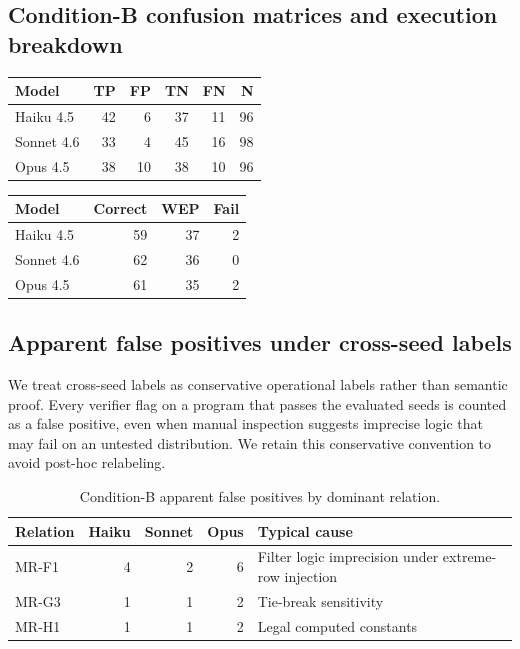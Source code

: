 \documentclass{article}
\begin{document}
\subsection{Condition-B confusion matrices and execution breakdown}

\noindent
\begin{minipage}[t]{0.52\linewidth}
\centering
{}
\small
\begin{tabular}{lrrrrr}
\toprule
Model & TP & FP & TN & FN & N \\
\midrule
Haiku 4.5 & 42 & 6 & 37 & 11 & 96 \\
Sonnet 4.6 & 33 & 4 & 45 & 16 & 98 \\
Opus 4.5 & 38 & 10 & 38 & 10 & 96 \\
\bottomrule
\end{tabular}
\end{minipage}%
\hfill
\begin{minipage}[t]{0.44\linewidth}
\centering
{}
\small
\begin{tabular}{lrrr}
\toprule
Model & Correct & WEP & Fail \\
\midrule
Haiku 4.5 & 59 & 37 & 2 \\
Sonnet 4.6 & 62 & 36 & 0 \\
Opus 4.5 & 61 & 35 & 2 \\
\bottomrule
\end{tabular}
\end{minipage}

\vspace{1em}

\subsection{Apparent false positives under cross-seed labels}
We treat cross-seed labels as conservative operational labels rather than semantic proof. Every verifier flag on a program that passes the evaluated seeds is counted as a false positive, even when manual inspection suggests imprecise logic that may fail on an untested distribution. We retain this conservative convention to avoid post-hoc relabeling.

\begin{table}[h]
\centering
\caption{Condition-B apparent false positives by dominant relation.}
\small
\begin{tabular}{lrrrp{5cm}}
\toprule
Relation & Haiku & Sonnet & Opus & Typical cause \\
\midrule
MR-F1 & 4 & 2 & 6 & Filter logic imprecision under extreme-row injection \\
MR-G3 & 1 & 1 & 2 & Tie-break sensitivity \\
MR-H1 & 1 & 1 & 2 & Legal computed constants \\
\bottomrule
\end{tabular}
\end{table}
\end{document}
